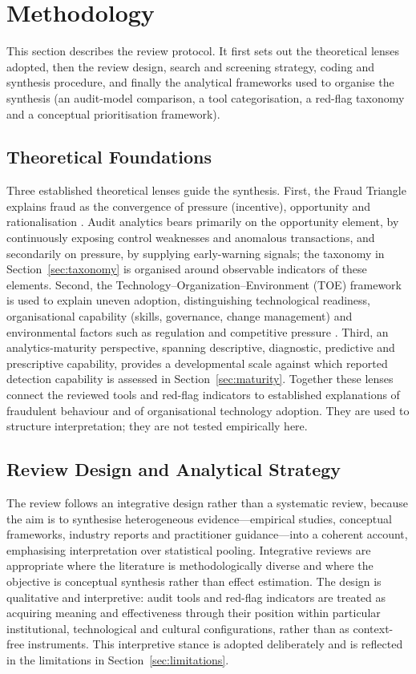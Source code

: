 \documentclass[conference]{IEEEtran}
\begin{document}
\section{Methodology}
\label{sec:method}

This section describes the review protocol. It first sets out the theoretical lenses adopted, then the review design, search and screening strategy, coding and synthesis procedure, and finally the analytical frameworks used to organise the synthesis (an audit-model comparison, a tool categorisation, a red-flag taxonomy and a conceptual prioritisation framework).

\subsection{Theoretical Foundations}

Three established theoretical lenses guide the synthesis. First, the Fraud Triangle explains fraud as the convergence of pressure (incentive), opportunity and rationalisation \cite{b66}. Audit analytics bears primarily on the opportunity element, by continuously exposing control weaknesses and anomalous transactions, and secondarily on pressure, by supplying early-warning signals; the taxonomy in Section~\ref{sec:taxonomy} is organised around observable indicators of these elements. Second, the Technology--Organization--Environment (TOE) framework is used to explain uneven adoption, distinguishing technological readiness, organisational capability (skills, governance, change management) and environmental factors such as regulation and competitive pressure \cite{b67}. Third, an analytics-maturity perspective, spanning descriptive, diagnostic, predictive and prescriptive capability, provides a developmental scale against which reported detection capability is assessed in Section~\ref{sec:maturity}. Together these lenses connect the reviewed tools and red-flag indicators to established explanations of fraudulent behaviour and of organisational technology adoption. They are used to structure interpretation; they are not tested empirically here.

\subsection{Review Design and Analytical Strategy}

The review follows an integrative design rather than a systematic review, because the aim is to synthesise heterogeneous evidence---empirical studies, conceptual frameworks, industry reports and practitioner guidance---into a coherent account, emphasising interpretation over statistical pooling. Integrative reviews are appropriate where the literature is methodologically diverse and where the objective is conceptual synthesis rather than effect estimation. The design is qualitative and interpretive: audit tools and red-flag indicators are treated as acquiring meaning and effectiveness through their position within particular institutional, technological and cultural configurations, rather than as context-free instruments. This interpretive stance is adopted deliberately and is reflected in the limitations in Section~\ref{sec:limitations}.
\end{document}
